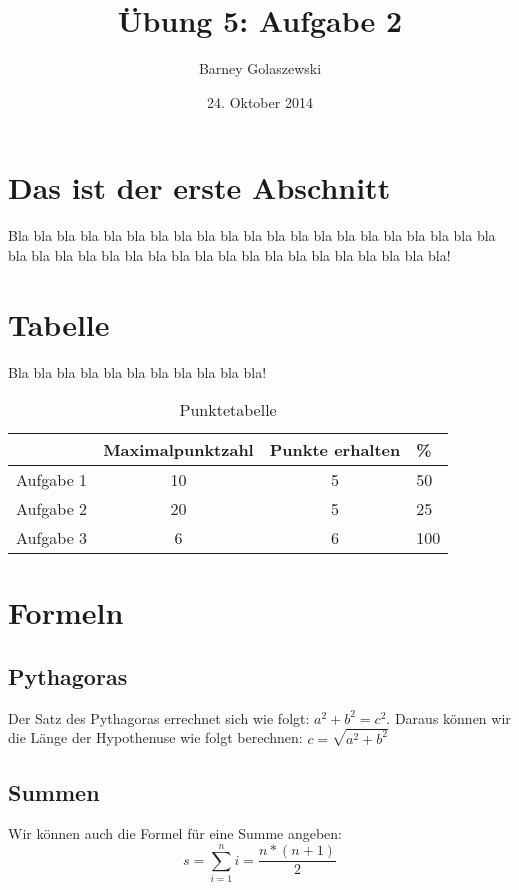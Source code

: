 \documentclass[11pt,a4paper]{article}
\title{Übung 5: Aufgabe 2}
\date{24. Oktober 2014}
\author{Barney Golaszewski}
\begin{document}
\maketitle


\section{Das ist der erste Abschnitt}
Bla bla bla bla bla bla bla bla bla bla bla bla bla bla bla bla bla bla bla bla bla bla bla bla bla bla bla bla bla bla bla bla bla bla bla bla bla bla bla bla! \cite{der1955einfuhrung}

\section{Tabelle}
Bla bla bla bla bla bla bla bla bla bla bla!

\begin{table}[h]
\centering
\begin{tabular}{r|c|c|l}
 & Maximalpunktzahl & Punkte erhalten & \% \\
\hline
Aufgabe 1 & 10 & 5 & 50 \\
Aufgabe 2 & 20 & 5 & 25 \\
Aufgabe 3 & 6 & 6 & 100 \\
\end{tabular}
\caption{Punktetabelle \cite{hilbert1928grundlagen}}
\end{table}

\section{Formeln}

\subsection{Pythagoras}
Der Satz des Pythagoras errechnet sich wie folgt: $a^2+b^2=c^2$. Daraus können wir die Länge der Hypothenuse wie folgt berechnen: $c=\sqrt{a^2+b^2}$ \cite{varma2013effect}

\subsection{Summen}
Wir können auch die Formel für eine Summe angeben:
\begin{equation}
s=\sum\limits_{i=1}^ni=\frac{n*(n+1)}{2}
\end{equation}



\end{document}
